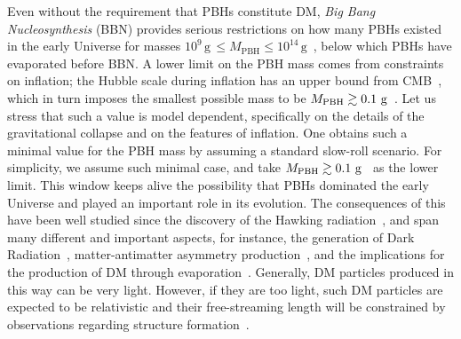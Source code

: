 \documentclass[aps,prd,reprint,twocolumn,preprintnumbers,floatfix,nofootinbib]{revtex4-1}
\newcommand{\g}{\rm g}
\begin{document}
Even without the requirement that PBHs constitute DM, {\em Big Bang Nucleosynthesis} (BBN) provides serious restrictions on how many PBHs existed in the early Universe for masses $10^9\,\textrm{g}\,\leq M_{\textrm{PBH}}\leq 10^{14}\,\textrm{g}$~\cite{Carr:2009jm,Carr:2020gox,Keith:2020jww}, below which PBHs have evaporated before BBN. A lower limit on the PBH mass comes from constraints on inflation; the Hubble scale during inflation has an upper bound from CMB~\cite{Akrami:2018odb}, which in turn imposes the smallest possible mass to be $M_{\textrm{PBH}}\gtrsim 0.1~\g$~\cite{Carr:2020gox}. Let us stress that such a value is model dependent, specifically on the details of the gravitational collapse and on the features of inflation. One obtains such a minimal value for the PBH mass by assuming a standard slow-roll scenario. For simplicity, we assume such minimal case, and take $M_{\textrm{PBH}}\gtrsim 0.1~\g$~\cite{Carr:2020gox} as the lower limit. This window keeps alive the possibility that PBHs dominated the early Universe and played an important role in its evolution. The consequences of this have been well studied since the discovery of the Hawking radiation~\cite{Carr:1976zz}, and span many different and important aspects, for instance, the generation of Dark Radiation~\cite{Carr:2020xqk,Hooper:2019gtx,Lunardini:2019zob,Inomata:2020lmk,Masina:2020xhk,Masina:2021zpu,Domenech:2021wkk}, matter-antimatter asymmetry production~\cite{Baumann:2007yr,Fujita:2014hha,Hook:2014mla,Hamada:2016jnq,Chaudhuri:2020wjo,Hooper:2020otu,Perez-Gonzalez:2020vnz,Datta:2020bht,JyotiDas:2021shi}, and the implications for the production of DM through evaporation~\cite{Matsas:1998zm,Bell:1998jk,Green:1999yh,Arbey:2021ysg,Khlopov:2004tn,Allahverdi:2017sks,Fujita:2014hha,Lennon:2017tqq,Morrison:2018xla,Hooper:2019gtx,Masina:2020xhk,Gondolo:2020uqv,Bernal:2020kse,Bernal:2020bjf,Bernal:2020ili,Kitabayashi:2021hox,Masina:2021zpu}. Generally, DM particles produced in this way can be very light. However, if they are too light, such DM particles are expected to be relativistic and their free-streaming length will be constrained by observations regarding structure formation~\cite{Baldes:2020nuv, Auffinger:2020afu,Masina:2020xhk, Masina:2021zpu}. 
\end{document}

